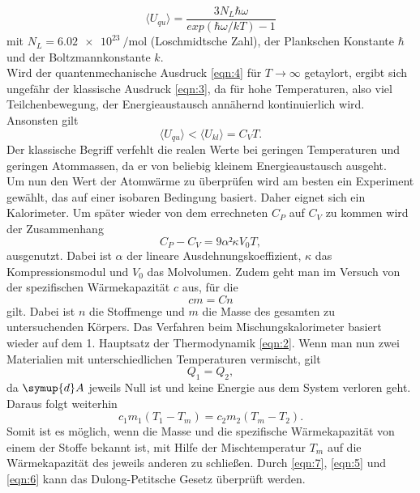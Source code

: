 \begin{equation}
  \langle U_{qu} \rangle = \frac{3N_L\hbar\omega}{exp(\hbar\omega/kT)-1}
  \label{eqn:4}
\end{equation}
mit $N_L = \SI{6,02e23}{\per\mol}$ (Loschmidtsche Zahl), der Plankschen Konstante $\hbar$ und der Boltzmannkonstante $k$.\\
Wird der quantenmechanische Ausdruck \ref{eqn:4} für $T\to\infty $ getaylort, ergibt sich ungefähr der klassische Ausdruck \ref{eqn:3}, da für hohe Temperaturen, also viel Teilchenbewegung, der Energieaustausch annähernd kontinuierlich wird.
Ansonsten gilt
\begin{equation}
  \langle U_{qu} \rangle < \langle U_{kl} \rangle = C_VT.
\end{equation}
Der klassische Begriff verfehlt die realen Werte bei geringen Temperaturen und geringen Atommassen, da er von beliebig kleinem Energieaustausch ausgeht.\\
Um nun den Wert der Atomwärme zu überprüfen wird am besten ein Experiment gewählt, das auf einer isobaren Bedingung basiert.
Daher eignet sich ein Kalorimeter.
Um später wieder von dem errechneten $C_P$ auf $C_V$ zu kommen wird der Zusammenhang
\begin{equation}
  C_P - C_V = 9 \alpha² \kappa V_0 T,
  \label{eqn:5}
\end{equation}
ausgenutzt.
Dabei ist $\alpha$ der lineare Ausdehnungskoeffizient, $\kappa$ das Kompressionsmodul und $V_0$ das Molvolumen.
Zudem geht man im Versuch von der spezifischen Wärmekapazität $c$ aus, für die
\begin{equation}
  cm = Cn
  \label{eqn:6}
\end{equation}
gilt.
Dabei ist $n$ die Stoffmenge und $m$ die Masse des gesamten zu untersuchenden Körpers.
Das Verfahren beim Mischungskalorimeter basiert wieder auf dem 1. Hauptsatz der Thermodynamik \ref{eqn:2}.
Wenn man nun zwei Materialien mit unterschiedlichen Temperaturen vermischt, gilt
\begin{equation}
  Q_1 = Q_2,
\end{equation}
da $\symup{d}A$ jeweils Null ist und keine Energie aus dem System verloren geht.
Daraus folgt weiterhin
\begin{equation}
  c_1m_1(T_1-T_m) = c_2m_2(T_m-T_2).
  \label{eqn:7}
\end{equation}
Somit ist es möglich, wenn die Masse und die spezifische Wärmekapazität von einem der Stoffe bekannt ist, mit Hilfe der Mischtemperatur $T_m$ auf die Wärmekapazität des jeweils anderen zu schließen.
Durch \ref{eqn:7}, \ref{eqn:5} und \ref{eqn:6} kann das Dulong-Petitsche Gesetz überprüft werden.


\cite{V201}
